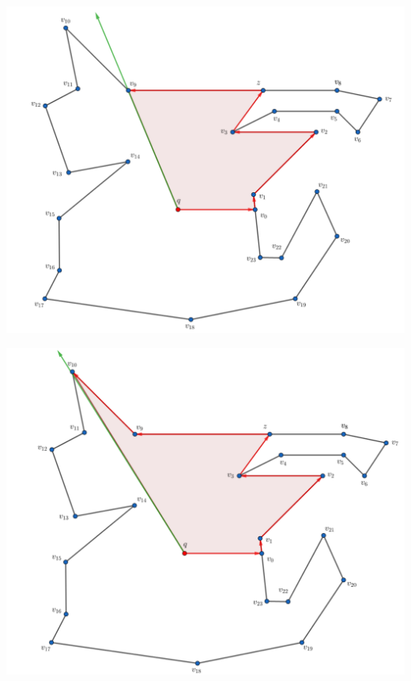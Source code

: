 \begin{frame}
  \centering \includegraphics[width=0.70 \paperwidth]{images/Ejecucion/e08.png}
\end{frame}

\begin{frame}
  \centering \includegraphics[width=0.70 \paperwidth]{images/Ejecucion/e09.png}
\end{frame}

